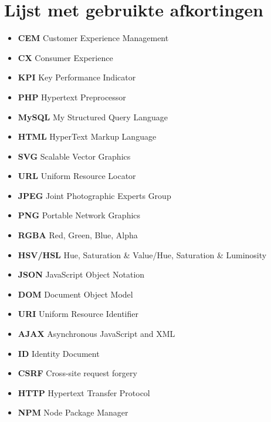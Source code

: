 \chapter{Lijst met gebruikte afkortingen}

\begin{itemize}
\item[] \textbf{CEM} \qquad Customer Experience Management
\item[] \textbf{CX} \qquad Consumer Experience
\item[] \textbf{KPI} \qquad Key Performance Indicator
\item[] \textbf{PHP} \qquad Hypertext Preprocessor
\item[] \textbf{MySQL} \qquad My Structured Query Language
\item[] \textbf{HTML} \qquad HyperText Markup Language
\item[] \textbf{SVG} \qquad Scalable Vector Graphics
\item[] \textbf{URL} \qquad Uniform Resource Locator
\item[] \textbf{JPEG} \qquad Joint Photographic Experts Group
\item[] \textbf{PNG} \qquad Portable Network Graphics
\item[] \textbf{RGBA} \qquad Red, Green, Blue, Alpha
\item[] \textbf{HSV/HSL} \qquad Hue, Saturation \& Value/Hue, Saturation \& Luminosity
\item[] \textbf{JSON} \qquad JavaScript Object Notation
\item[] \textbf{DOM} \qquad Document Object Model
\item[] \textbf{URI} \qquad Uniform Resource Identifier
\item[] \textbf{AJAX} \qquad Asynchronous JavaScript and XML
\item[] \textbf{ID} \qquad Identity Document
\item[] \textbf{CSRF} \qquad Cross-site request forgery
\item[] \textbf{HTTP} \qquad Hypertext Transfer Protocol
\item[] \textbf{NPM} \qquad Node Package Manager
\end{itemize}	


